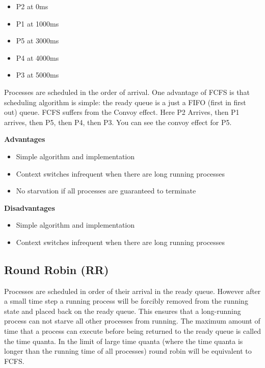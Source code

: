 \begin{itemize}
\tightlist
\item
  P2 at 0ms
\item
  P1 at 1000ms
\item
  P5 at 3000ms
\item
  P4 at 4000ms
\item
  P3 at 5000ms
\end{itemize}

Processes are scheduled in the order of arrival. One advantage of FCFS is that scheduling algorithm is simple: the ready queue is a just a FIFO (first in first out) queue. FCFS suffers from the Convoy effect. Here P2 Arrives, then P1 arrives, then P5, then P4, then P3. You can see the convoy effect for P5.

\textbf{Advantages}

\begin{itemize}
\item Simple algorithm and implementation
\item Context switches infrequent when there are long running processes
\item No starvation if all processes are guaranteed to terminate
\end{itemize}

\textbf{Disadvantages}
\begin{itemize}
\item Simple algorithm and implementation
\item Context switches infrequent when there are long running processes

\end{itemize}

\subsection{Round Robin (RR)}

Processes are scheduled in order of their arrival in the ready queue. However after a small time step a running process will be forcibly removed from the running state and placed back on the ready queue. This ensures that a long-running process can not starve all other processes from running. The maximum amount of time that a process can execute before being returned to the ready queue is called the time quanta. In the limit of large time quanta (where the time quanta is longer than the running time of all processes) round robin will be equivalent to FCFS.

